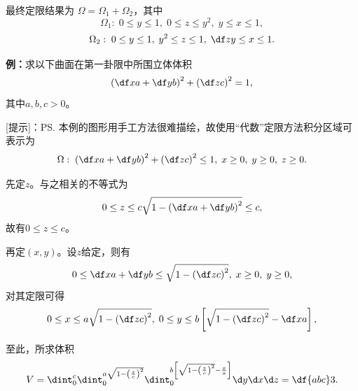 最终定限结果为
$\Omega=\Omega_1+\Omega_2$，其中
$$\Omega_1:\;0\leq y\leq 1,\;0\leq z\leq y^2,\; y\leq x\leq 1,$$
$$\Omega_2:\;0\leq y\leq 1,\;y^2\leq z\leq 1,\; \df zy\leq x\leq 1.$$

{\bf 例：}求以下曲面在第一卦限中所围立体体积
$$\left(\df xa+\df yb\right)^2+\left(\df zc\right)^2=1,$$
其中$a,b,c>0$。

\begin{center}
\end{center}

[提示]：\ps{本例的图形用手工方法很难描绘，故使用“代数”定限方法}积分区域可表示为
$$\Omega:\;\left(\df xa+\df yb\right)^2+\left(\df zc\right)^2\leq1,\;
x\geq0,\;y\geq0,\;z\geq0.$$

先定$z$。与之相关的不等式为
$$0\leq z\leq c\sqrt{1-\left(\df xa+\df yb\right)^2}\leq c,$$
故有$0\leq z\leq c$。

再定$(x,y)$。设$z$给定，则有
$$0\leq\df xa+\df yb\leq\sqrt{1-\left(\df zc\right)^2},
\;x\geq0,\;y\geq0,$$
对其定限可得
$$0\leq x\leq a\sqrt{1-\left(\df zc\right)^2},\;
0\leq y\leq b\left[\sqrt{1-\left(\df zc\right)^2}-\df xa\right],$$

至此，所求体积
$$V=\dint_0^c\dint_0^{a\sqrt{1-\left(\frac zc\right)^2}}
\dint_0^{b\left[\sqrt{1-\left(\frac zc\right)^2}-\frac xa\right]}
\d y\d x\d z=\df{abc}3.$$

